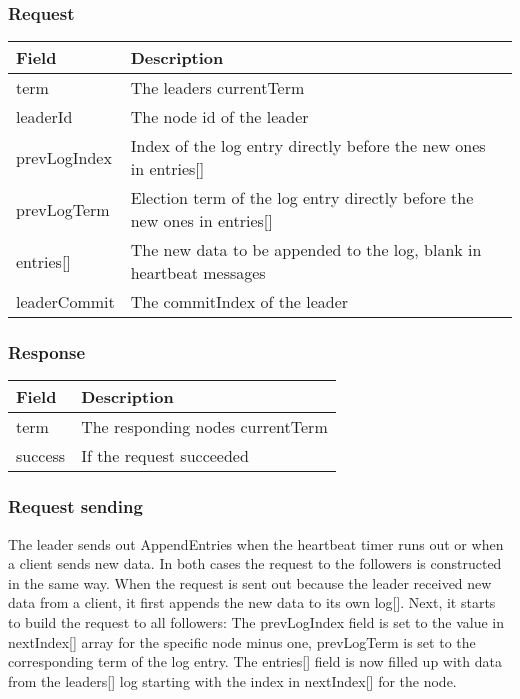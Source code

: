 \subsubsection*{Request}

\begin{tabularx}{\textwidth}{ | p{80px} | X | }
\hline
\textbf{Field} & \textbf{Description} \\ \hline
term & The leaders currentTerm \\ \hline
leaderId & The node id of the leader \\ \hline
prevLogIndex & Index of the log entry directly before the new ones in entries[] \\ \hline
prevLogTerm & Election term of the log entry directly before the new ones in entries[] \\ \hline
entries[] & The new data to be appended to the log, blank in heartbeat messages \\ \hline
leaderCommit & The commitIndex of the leader \\ \hline
\end{tabularx}

\subsubsection*{Response}

\begin{tabularx}{\textwidth}{ | p{80px} | X | }
\hline
\textbf{Field} & \textbf{Description} \\ \hline
term & The responding nodes currentTerm \\ \hline
success & If the request succeeded \\ \hline
\end{tabularx}

\subsubsection*{Request sending}

The leader sends out AppendEntries when the heartbeat timer runs out or when a client sends new data. In both cases the request to the followers is constructed in the same way. When the request is sent out because the leader received new data from a client, it first appends the new data to its own log[]. Next, it starts to build the request to all followers: The prevLogIndex field is set to the value in nextIndex[] array for the specific node minus one, prevLogTerm is set to the corresponding term of the log entry. The entries[] field is now filled up with data from the leaders[] log starting with the index in nextIndex[] for the node.

